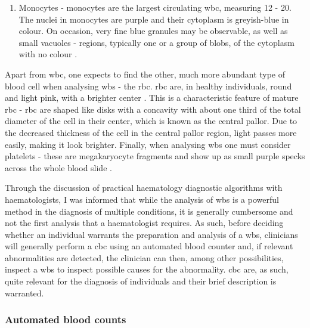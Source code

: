 \begin{enumerate}
    \item{Monocytes} - monocytes are the largest circulating \ac{wbc}, measuring 12 - 20\Mum. The nuclei in monocytes are purple and their cytoplasm is greyish-blue in colour. On occasion, very fine blue granules may be observable, as well as small vacuoles - regions, typically one or a group of blobs, of the cytoplasm with no colour \cite{Bain2014-oc}.
\end{enumerate}

\begin{figure}[H]
	\label{fig:blood-cell-examples}
\end{figure}

Apart from \ac{wbc}, one expects to find the other, much more abundant type of blood cell when analysing \ac{wbs} - the \ac{rbc}. \ac{rbc} are, in healthy individuals, round and light pink, with a brighter center \cite{Bain2014-oc}. This is a characteristic feature of mature \ac{rbc} - \ac{rbc} are shaped like disks with a concavity with about one third of the total diameter of the cell in their center, which is known as the central pallor. Due to the decreased thickness of the cell in the central pallor region, light passes more easily, making it look brighter. Finally, when analysing \ac{wbs} one must consider platelets - these are megakaryocyte fragments and show up as small purple specks across the whole blood slide \cite{Bain2014-oc,Wright1906-af}.

Through the discussion of practical haematology diagnostic algorithms with haematologists, I was informed that while the analysis of \ac{wbs} is a powerful method in the diagnosis of multiple conditions, it is generally cumbersome and not the first analysis that a haematologist requires. As such, before deciding whether an individual warrants the preparation and analysis of a \ac{wbs}, clinicians will generally perform a \ac{cbc} using an automated blood counter and, if relevant abnormalities are detected, the clinician can then, among other possibilities, inspect a \ac{wbs} to inspect possible causes for the abnormality. \ac{cbc} are, as such, quite relevant for the diagnosis of individuals and their brief description is warranted.

\subsubsection{Automated blood counts}

